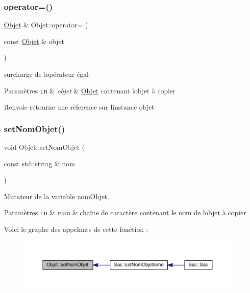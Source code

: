 \subsubsection{\texorpdfstring{operator=()}{operator=()}}
{\footnotesize\ttfamily \hyperlink{class_objet}{Objet} \& Objet\+::operator= (\begin{DoxyParamCaption}\item[{const \hyperlink{class_objet}{Objet} \&}]{objet }\end{DoxyParamCaption})}



surcharge de l\textquotesingle{}opérateur égal 


\begin{DoxyParams}[1]{Paramètres}
\mbox{\tt in}  & {\em objet} & \hyperlink{class_objet}{Objet} contenant l\textquotesingle{}objet à copier \\
\hline
\end{DoxyParams}
\begin{DoxyReturn}{Renvoie}
retourne une réference sur l\textquotesingle{}instance objet 
\end{DoxyReturn}
\mbox{\label{class_objet_a666418b066069a2a5e35f88dc1f77f0f}} 
\subsubsection{\texorpdfstring{set\+Nom\+Objet()}{setNomObjet()}}
{\footnotesize\ttfamily void Objet\+::set\+Nom\+Objet (\begin{DoxyParamCaption}\item[{const std\+::string \&}]{nom }\end{DoxyParamCaption})}



Mutateur de la variable nom\+Objet. 


\begin{DoxyParams}[1]{Paramètres}
\mbox{\tt in}  & {\em nom} & chaîne de caractère contenant le nom de l\textquotesingle{}objet à copier \\
\hline
\end{DoxyParams}
Voici le graphe des appelants de cette fonction \+:\nopagebreak
\begin{figure}[H]
\begin{center}
\leavevmode
\includegraphics[width=350pt]{class_objet_a666418b066069a2a5e35f88dc1f77f0f_icgraph}
\end{center}
\end{figure}
\mbox{\label{class_objet_a92eac9151b39f0a03a94ba02f25018c9}} 
